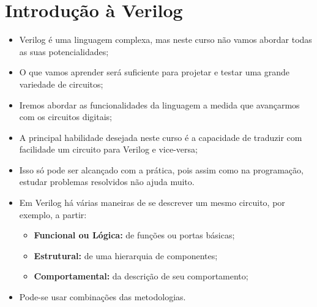 

\subtitle{Introdução à Verilog} %



\begin{frame}
	\titlepage
\end{frame} 

\section{Introdução à Verilog}

\begin{frame}{\insertsection} %
	\begin{itemize}
		\item Verilog é uma linguagem complexa, mas neste curso não vamos abordar todas as suas potencialidades;
		\item O que vamos aprender será suficiente para projetar e testar uma grande variedade de circuitos;
		\item Iremos abordar as funcionalidades da linguagem a medida que avançarmos com os circuitos digitais; 
		\item A principal habilidade desejada neste curso é a capacidade de traduzir com facilidade um circuito para Verilog e vice-versa; 
		\item Isso só pode ser alcançado com a prática, pois assim como na programação, estudar problemas resolvidos não ajuda muito. 
    \end{itemize}
\end{frame}

\begin{frame}{\insertsection} %
	\begin{itemize}
		\item Em Verilog há várias maneiras de se descrever um mesmo circuito, por exemplo, a partir:
		\begin{itemize}
			\item \textbf{Funcional ou Lógica:} de funções ou portas básicas; 
			\item \textbf{Estrutural:} de uma hierarquia de componentes; 
			\item \textbf{Comportamental:} da descrição de seu comportamento; 
		\end{itemize}
		\item Pode-se usar combinações das metodologias. 
	\end{itemize}
\end{frame}

